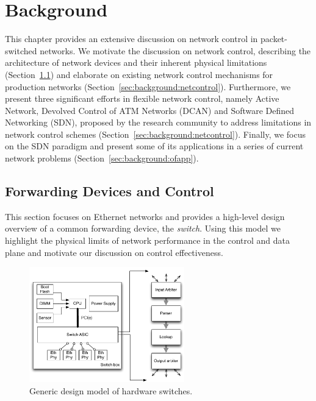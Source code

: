\chapter{Background} \label{ch:background}

This chapter provides an extensive discussion on network control in
packet-switched networks.  We motivate the discussion on network control,
describing the architecture of network devices and their inherent physical
limitations (Section~\ref{sec:background:forwarding}) and elaborate on existing
network control mechanisms for production networks
(Section~\ref{sec:background:netcontrol}).  Furthermore, we present three
significant efforts in flexible network control, namely Active Network,
Devolved Control of ATM Networks (DCAN) and Software Defined Networking (SDN),
proposed by the research community to address limitations in network control
schemes (Section~\ref{sec:background:netcontrol}). Finally, we focus on the SDN
paradigm and present some of its applications in a series of current network
problems (Section~\ref{sec:background:ofapp}).

\section{Forwarding Devices and Control} \label{sec:background:forwarding}

This section focuses on Ethernet networks and provides a high-level design
overview of a common forwarding device, the \emph{switch}. Using this model we
highlight the physical limits of network performance in the control and data
plane and motivate our discussion on control effectiveness.

\begin{figure}
  \centering
\includegraphics[width=0.6\textwidth]{Background/BackgroundFigs/switch_design}
\caption{Generic design model of hardware switches.}
\label{fig:background:switch_design}
\end{figure}

